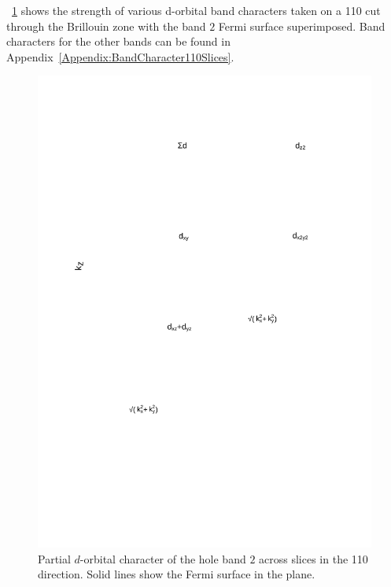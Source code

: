 \Fig~\ref{Fig:3:Band2DCharacter} shows the strength of various d-orbital band characters taken on a 110 cut through the \BaFeP Brillouin zone with the band $2$ Fermi surface superimposed. Band characters for the other bands can be found in Appendix~\ref{Appendix:BandCharacter110Slices}.
\begin{figure}[h!]
    \begin{center}
        \includegraphics[scale=0.7]{Chapter3-dHvABaFe2P2/Figures/AngleDepMeasurements/BandCharacterPlot/Band2_110Slice_BandCharacter}
        \caption{Partial $d$-orbital character of the hole band $2$ across slices in the 110 direction. Solid lines show the Fermi surface in the plane.}
        \label{Fig:3:Band2DCharacter}
    \end{center}
\end{figure}
